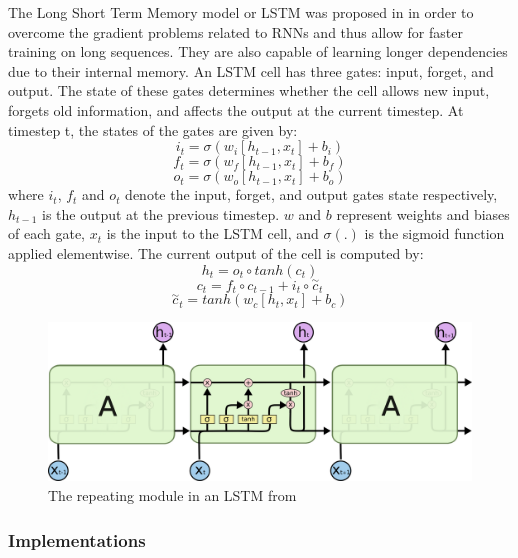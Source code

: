 The Long Short Term Memory model or LSTM was proposed in \cite{LSTMs} in order to overcome the gradient problems related to RNNs and thus allow for faster training on long sequences.
They are also capable of learning longer dependencies due to their internal memory. An LSTM cell has three gates: input, forget, and output.
The state of these gates determines whether the cell allows new input, forgets old information, and affects the output at the current timestep.
At timestep t, the states of the gates are given by:
\begin{equation}
    i_t=\sigma(w_i[h_{t-1},x_t]+b_i)
\end{equation}
\begin{equation}
    f_t=\sigma(w_f[h_{t-1},x_t]+b_f)
\end{equation}
\begin{equation}
    o_t=\sigma(w_o[h_{t-1},x_t]+b_o)
\end{equation}
where $i_t$, $f_t$ and $o_t$ denote the input, forget, and output gates state respectively, $h_{t-1}$ is the output at the previous timestep.
$w$ and $b$ represent weights and biases of each gate, $x_t$ is the input to the LSTM cell, and $\sigma (.)$ is the sigmoid function applied elementwise.
The current output of the cell is computed by:
\begin{equation}
    h_t=o_t \circ tanh(c_t)
\end{equation}
\begin{equation}
    c_t = f_t \circ c_{t-1}+i_t \circ \overset{\sim}{c}_t
\end{equation}
\begin{equation}
    \overset{\sim}{c}_t = tanh(w_c[h_t,x_t]+b_c)
\end{equation}

\begin{figure}
    \centering
    \includegraphics[width=0.8\columnwidth]{Figures/LSTM}
    \decoRule
    \caption{The repeating module in an LSTM from \cite{oinkina}}
    \label{fig:LSTM}
\end{figure}

\subsubsection{Implementations}

